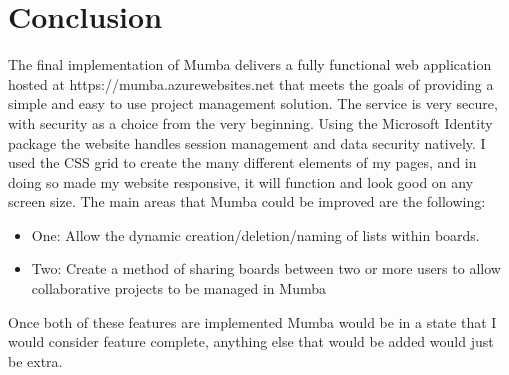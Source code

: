 \documentclass[letterpaper]{article}
\begin{document}
\pagebreak
\section{Conclusion}
The final implementation of Mumba delivers a fully functional web application hosted at https://mumba.azurewebsites.net that meets the goals of providing a simple and easy to use project management solution. The service is very secure, with security as a choice from the very beginning. Using the Microsoft Identity package the website handles session management and data security natively. I used the CSS grid to create the many different elements of my pages, and in doing so made my website responsive, it will function and look good on any screen size. The main areas that Mumba could be improved are the following:
\begin{itemize}
  \item One: Allow the dynamic creation/deletion/naming of lists within boards.
  \item Two: Create a method of sharing boards between two or more users to allow collaborative projects to be managed in Mumba
\end{itemize}
Once both of these features are implemented Mumba would be in a state that I would consider feature complete, anything else that would be added would just be extra.
\end{document}
